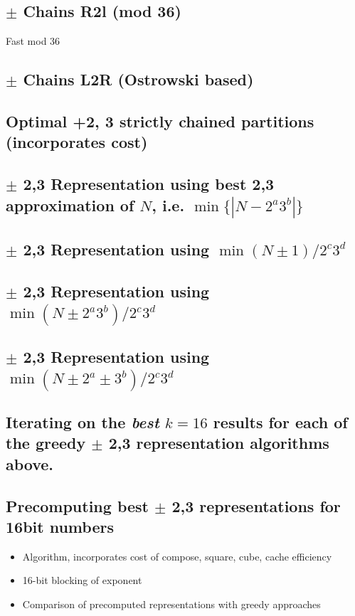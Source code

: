\documentclass{ucalgthes1}
\theoremstyle{plain}
\theoremstyle{definition}
\begin{document}
\subsection{$\pm$ Chains R2l (mod 36)}
Fast mod 36

\subsection{$\pm$ Chains L2R (Ostrowski based)}

\subsection{Optimal +2, 3 strictly chained partitions (incorporates cost)}

\subsection{$\pm$ 2,3 Representation using best 2,3 approximation of $N$, i.e. $\min\{|N-2^a3^b|\}$}

\subsection{$\pm$ 2,3 Representation using $\min (N \pm 1) / 2^c3^d$}

\subsection{$\pm$ 2,3 Representation using $\min (N \pm 2^a3^b) / 2^c 3^d$}

\subsection{$\pm$ 2,3 Representation using $\min (N \pm 2^a \pm 3^b)/2^c3^d$}

\subsection{Iterating on the \emph{best} $k=16$ results for each of the greedy $\pm$ 2,3 representation algorithms above.}

\subsection{Precomputing best $\pm$ 2,3 representations for 16bit numbers}
\begin{itemize}
\item Algorithm, incorporates cost of compose, square, cube, cache efficiency
\item 16-bit blocking of exponent
\item Comparison of precomputed representations with greedy approaches
\end{itemize}
\end{document}
